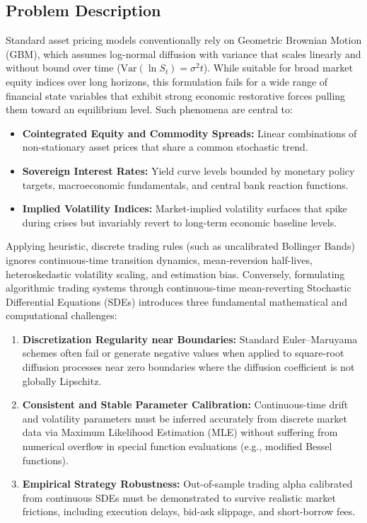 \documentclass[11pt,a4paper]{article}
\begin{document}
\subsection*{Problem Description}
Standard asset pricing models conventionally rely on Geometric Brownian Motion (GBM), which assumes log-normal diffusion with variance that scales linearly and without bound over time ($\mathrm{Var}(\ln S_t) = \sigma^2 t$). While suitable for broad market equity indices over long horizons, this formulation fails for a wide range of financial state variables that exhibit strong economic restorative forces pulling them toward an equilibrium level. Such phenomena are central to:
\begin{itemize}
    \item \textbf{Cointegrated Equity and Commodity Spreads:} Linear combinations of non-stationary asset prices that share a common stochastic trend.
    \item \textbf{Sovereign Interest Rates:} Yield curve levels bounded by monetary policy targets, macroeconomic fundamentals, and central bank reaction functions.
    \item \textbf{Implied Volatility Indices:} Market-implied volatility surfaces that spike during crises but invariably revert to long-term economic baseline levels.
\end{itemize}

Applying heuristic, discrete trading rules (such as uncalibrated Bollinger Bands) ignores continuous-time transition dynamics, mean-reversion half-lives, heteroskedastic volatility scaling, and estimation bias. Conversely, formulating algorithmic trading systems through continuous-time mean-reverting Stochastic Differential Equations (SDEs) introduces three fundamental mathematical and computational challenges:
\begin{enumerate}
    \item \textbf{Discretization Regularity near Boundaries:} Standard Euler--Maruyama schemes often fail or generate negative values when applied to square-root diffusion processes near zero boundaries where the diffusion coefficient is not globally Lipschitz.
    \item \textbf{Consistent and Stable Parameter Calibration:} Continuous-time drift and volatility parameters must be inferred accurately from discrete market data via Maximum Likelihood Estimation (MLE) without suffering from numerical overflow in special function evaluations (e.g., modified Bessel functions).
    \item \textbf{Empirical Strategy Robustness:} Out-of-sample trading alpha calibrated from continuous SDEs must be demonstrated to survive realistic market frictions, including execution delays, bid-ask slippage, and short-borrow fees.
\end{enumerate}
\end{document}
